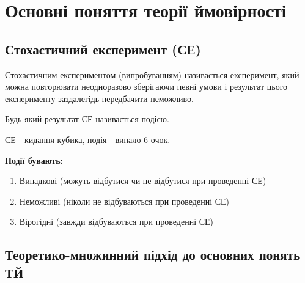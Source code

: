 
\section{Основні поняття теорії ймовірності}
\subsection*{Стохастичний експеримент (СЕ)}
\begin{definition}
    Стохастичним експериментом (випробуванням) називається експеримент, 
    який можна повторювати неодноразово зберігаючи певні умови і результат цього 
    експерименту заздалегідь передбачити неможливо.
\end{definition}
\begin{definition}
    Будь-який результат СЕ називається подією.
\end{definition}
\begin{example}
    СЕ - кидання кубика, подія - випало 6 очок.
\end{example}

\textbf{Події бувають:}
\begin{enumerate}
    \item Випадкові (можуть відбутися чи не відбутися при проведенні СЕ)
    \item Неможливі (ніколи не відбуваються при проведенні СЕ)
    \item Вірогідні (завжди відбуваються при проведенні СЕ)
\end{enumerate}
\subsection*{Теоретико-множинний підхід до основних понять ТЙ}

